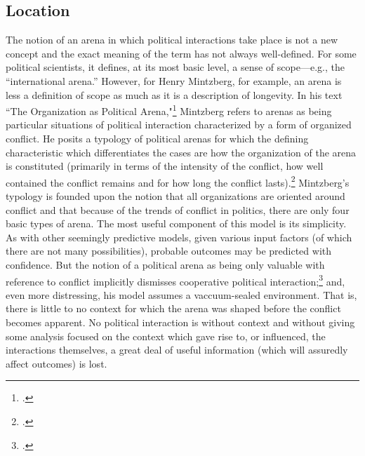\documentclass{article}
\begin{document}
\subsection{Location}
The notion of an arena in which political interactions take place is not a new concept and the exact meaning of the term has not always well-defined. 
For some political scientists, it defines, at its most basic level, a sense of scope---e.g., the ``international arena.'' 
However, for Henry Mintzberg, for example, an arena is less a definition of scope as much as it is a description of longevity. 
In his text ``The Organization as Political Arena,"\footcite{mintzberg85} Mintzberg refers to arenas as being particular situations of political interaction characterized by a form of organized conflict. 
He posits a typology of political arenas for which the defining characteristic which differentiates the cases are how the organization of the arena is constituted (primarily in terms of the intensity of the conflict, how well contained the conflict remains and for how long the conflict lasts).\footcite[141]{mintzberg85} 
Mintzberg's typology is founded upon the notion that all organizations are oriented around conflict and that because of the trends of conflict in politics, there are only four basic types of arena. 
The most useful component of this model is its simplicity. 
As with other seemingly predictive models, given various input factors (of which there are not many possibilities), probable outcomes may be predicted with confidence. 
But the notion of a political arena as being only valuable with reference to conflict implicitly dismisses cooperative political interaction;\footcite[152]{mintzberg85} and, even more distressing, his model assumes a vaccuum-sealed environment. 
That is, there is little to no context for which the arena was shaped before the conflict becomes apparent. 
No political interaction is without context and without giving some analysis focused on the context which gave rise to, or influenced, the interactions themselves, a great deal of useful information (which will assuredly affect outcomes) is lost.
\end{document}
